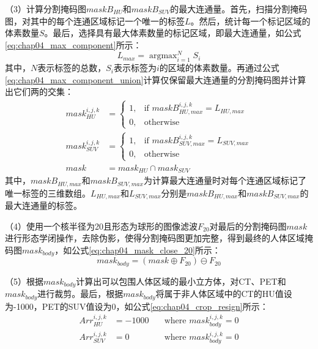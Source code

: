 （3）计算分割掩码图\(maskB_{HU}\)和\(maskB_{SUV}\)的最大连通量。首先，扫描分割掩码图，对其中的每个连通区域标记一个唯一的标签\(L\)。然后，统计每一个标记区域的体素数量\(S\)。最后，选择具有最大体素数量的标记区域，即最大连通量，如公式\ref{eq:chap04_max_component}所示：
\begin{equation}
  L_{max} = \mathop{\arg\max}_{i=1}^N S_i
  \label{eq:chap04_max_component}
\end{equation}
其中，\(N\)表示标签的总数，\(S_i\)表示标签为\(i\)的区域的体素数量。再通过公式\ref{eq:chap04_max_component_union}计算仅保留最大连通量的分割掩码图并计算出它们两的交集：
\begin{equation}
  \begin{aligned}
    mask_{HU}^{i,j,k}  & =
    \begin{cases}
      1, & \text{if \(maskB_{HU, max}^{i,j,k} = L_{HU,max}\)} \\
      0, & \text{otherwise}
    \end{cases}  \\
    mask_{SUV}^{i,j,k} & =
    \begin{cases}
      1, & \text{if \(maskB_{SUV, max}^{i,j,k} = L_{SUV,max}\)} \\
      0, & \text{otherwise}
    \end{cases} \\
    mask               & = mask_{HU} \cap mask_{SUV}
  \end{aligned}
  \label{eq:chap04_max_component_union}
\end{equation}
其中，\(maskB_{HU, max}\)和\(maskB_{SUV, max}\)为计算最大连通量时对每个连通区域标记了唯一标签的三维数组。\(L_{HU,max}\)和\(L_{SUV,max}\)分别是\(maskB_{HU, max}\)和\(maskB_{SUV, max}\)的最大连通量的标签。

（4）使用一个核半径为20且形态为球形的图像滤波\(F_{20}\)对最后的分割掩码图\(mask\)进行形态学闭操作，去除伪影，使得分割掩码图更加完整，得到最终的人体区域掩码图\(mask_{body}\)，如公式\ref{eq:chap04_mask_close_20}所示：
\begin{equation}
  mask_{body} = (mask \oplus F_{20} ) \ominus F_{20}
  \label{eq:chap04_mask_close_20}
\end{equation}

（5）根据\(mask_{body}\)计算出可以包围人体区域的最小立方体，对CT、PET和\(mask_{body}\)进行裁剪。最后，根据\(mask_{body}\)将属于非人体区域中的CT的HU值设为-1000，PET的SUV值设为0，如公式\ref{eq:chap04_crop_resign}所示：
\begin{equation}
  \begin{aligned}
    Arr_{HU}^{i, j, k}  & = -1000 \quad & \text{where \(mask_{body}^{i,j,k} = 0\)} \\
    Arr_{SUV}^{i, j, k} & = 0 \quad     & \text{where \(mask_{body}^{i,j,k} = 0\)}
  \end{aligned}
  \label{eq:chap04_crop_resign}
\end{equation}

